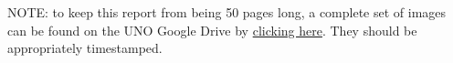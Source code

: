 \documentclass{article}
\begin{document}
\begin{appendices}
\par NOTE: to keep this report from being 50 pages long, a complete set of images can be found on the UNO Google Drive by \href{https://drive.google.com/drive/folders/1thcSPIT0QEPa8tnmXHmzTmB66VScgZe-?usp=sharing}{clicking here}. They should be appropriately timestamped.

\end{appendices}
\end{document}
